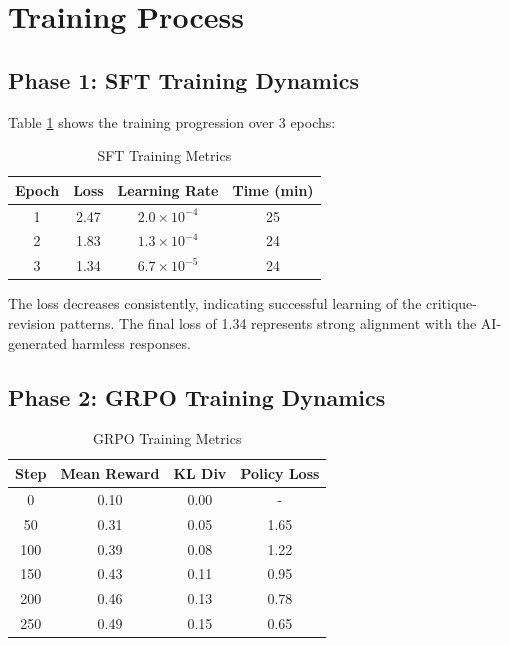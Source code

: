 \documentclass[conference]{IEEEtran}
\begin{document}
\section{Training Process}

\subsection{Phase 1: SFT Training Dynamics}

Table \ref{tab:sft_training} shows the training progression over 3 epochs:

\begin{table}[htbp]
\caption{SFT Training Metrics}
\begin{center}
\begin{tabular}{|c|c|c|c|}
\hline
\textbf{Epoch} & \textbf{Loss} & \textbf{Learning Rate} & \textbf{Time (min)} \\
\hline
1 & 2.47 & $2.0 \times 10^{-4}$ & 25 \\
2 & 1.83 & $1.3 \times 10^{-4}$ & 24 \\
3 & 1.34 & $6.7 \times 10^{-5}$ & 24 \\
\hline
\end{tabular}
\label{tab:sft_training}
\end{center}
\end{table}

The loss decreases consistently, indicating successful learning of the critique-revision patterns. The final loss of 1.34 represents strong alignment with the AI-generated harmless responses.

\subsection{Phase 2: GRPO Training Dynamics}

\begin{table}[htbp]
\caption{GRPO Training Metrics}
\begin{center}
\begin{tabular}{|c|c|c|c|}
\hline
\textbf{Step} & \textbf{Mean Reward} & \textbf{KL Div} & \textbf{Policy Loss} \\
\hline
0 & 0.10 & 0.00 & - \\
50 & 0.31 & 0.05 & 1.65 \\
100 & 0.39 & 0.08 & 1.22 \\
150 & 0.43 & 0.11 & 0.95 \\
200 & 0.46 & 0.13 & 0.78 \\
250 & 0.49 & 0.15 & 0.65 \\
\hline
\end{tabular}
\label{tab:grpo_training}
\end{center}
\end{table}
\end{document}
